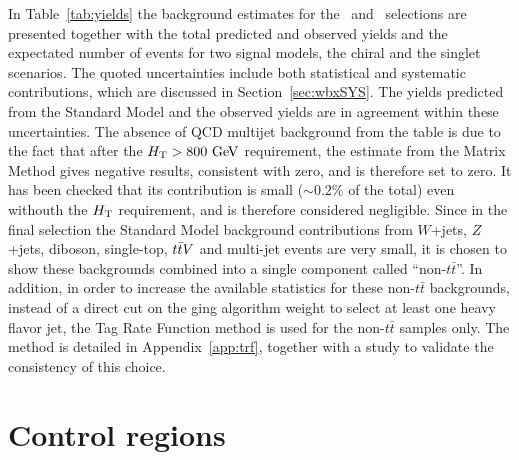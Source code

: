 In Table~\ref{tab:yields} the background estimates 
for the \loose\ and \tight\ selections are presented
together with the total predicted and observed yields
and the expectated number of events for two signal models, the
chiral and the singlet scenarios. 
The quoted uncertainties include both statistical and systematic contributions,
which are discussed in Section~\ref{sec:wbxSYS}.
The yields predicted from the Standard Model and the observed yields 
are in agreement within these uncertainties.
The absence of QCD multijet background from the table is due
to the fact that after the $\HT>800\gev$ requirement, the estimate
from the Matrix Method gives negative results, consistent with zero,
and is therefore set to zero.
It has been checked that its contribution is small ($\sim 0.2\%$ of the total)
even withouth the $\HT$ requirement, and is therefore considered negligible.
Since in the final selection the Standard Model background contributions
from $W$+jets, $Z$+jets, diboson, single-top, $\ttbar V$ and multi-jet events
are very small, it is chosen to show these backgrounds combined into a
single component called ``non-$t\bar{t}$''.
In addition, in order to increase the available statistics for these
non-$t\bar{t}$ backgrounds, instead of a direct cut on the \btag ging algorithm
weight to select at least one heavy flavor jet, the Tag Rate Function method
is used for the non-$t\bar{t}$ samples only. The method is detailed in 
Appendix~\ref{app:trf}, together with a study to validate the consistency
of this choice.




%



\section{Control regions}\label{sec:wbxCR}

